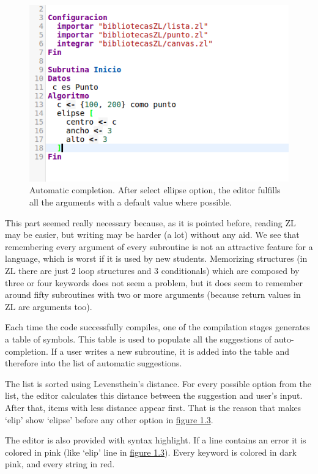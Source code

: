 \documentclass{report}
\begin{document}
\begin{figure}
\centering
\includegraphics[width=0.7\linewidth]{aftercompletion}
\caption[Automatic completion]{Automatic completion. After select ellipse option, the editor fulfills all the arguments with a default value where possible.}
\label{fig:aftercompletion}
\end{figure}

	This part seemed really necessary because, as it is pointed before, reading ZL may be easier, but writing may be harder (a lot) without any aid. We see that remembering every argument of every subroutine is not an attractive feature for a language, which is worst if it is used by new students. Memorizing structures (in ZL there are just 2 loop structures and 3 conditionals) which are composed by three or four keywords does not seem a problem, but it does seem to remember around fifty subroutines with two or more arguments (because return values in ZL are arguments too). 
	
	Each time the code successfully compiles, one of the compilation stages generates a table of symbols. This table is used to populate all the suggestions of auto-completion. If a user writes a new subroutine, it is added into the table and therefore into the list of automatic suggestions.
	
	The list is sorted using Levensthein's distance\cite{levensthein}. For every possible option from the list, the editor calculates this distance between the suggestion and user's input. After that, items with less distance appear first. That is the reason that makes `elip' show `elipse' before any other option in \hyperref[fig:beforecompletion]{figure 1.3}.
	
	The editor is also provided with syntax highlight. If a line contains an error it is colored in pink (like `elip' line in \hyperref[fig:beforecompletion]{figure 1.3}). Every keyword is colored in dark pink, and every string in red. 
	
\end{document}
